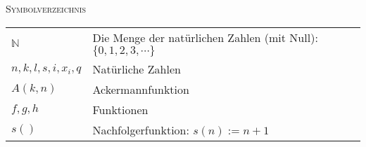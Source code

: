 \documentclass[a4paper]{amsart}
\theoremstyle{definition}
\newcommand{\N}{\ensuremath{\mathbb{ N }}}
\begin{document}
\begin{large}
    \centerline{\textsc{Symbolverzeichnis}}
\end{large}
\bigskip

\renewcommand*{\arraystretch}{1}

\begin{tabular}{ll}
    $\N$                    & Die Menge der natürlichen Zahlen (mit Null): $\{ 0, 1, 2, 3, \cdots \}$\\
    $n, k, l, s, i, x_i, q$ & Natürliche Zahlen\\
    $A( k, n )$             & Ackermannfunktion\\
    $f, g, h$               & Funktionen\\
    $s()$                   & Nachfolgerfunktion: $s(n) := n+1$

\end{tabular}
\end{document}
